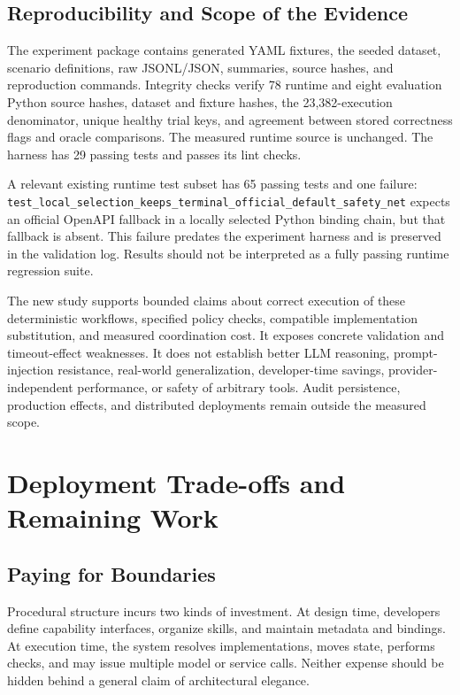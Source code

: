 \documentclass[10pt,twocolumn,a4paper]{article}
\begin{document}
\subsection{Reproducibility and Scope of the Evidence}

The experiment package contains generated YAML fixtures, the seeded dataset, scenario definitions, raw JSONL/JSON, summaries, source hashes, and reproduction commands. Integrity checks verify 78 runtime and eight evaluation Python source hashes, dataset and fixture hashes, the 23,382-execution denominator, unique healthy trial keys, and agreement between stored correctness flags and oracle comparisons. The measured runtime source is unchanged. The harness has 29 passing tests and passes its lint checks.


A relevant existing runtime test subset has 65 passing tests and one failure: {\small{}\nolinkurl{test_local_selection_keeps_terminal_official_default_safety_net}} expects an official OpenAPI fallback in a locally selected Python binding chain, but that fallback is absent. This failure predates the experiment harness and is preserved in the validation log. Results should not be interpreted as a fully passing runtime regression suite.


The new study supports bounded claims about correct execution of these deterministic workflows, specified policy checks, compatible implementation substitution, and measured coordination cost. It exposes concrete validation and timeout-effect weaknesses. It does not establish better LLM reasoning, prompt-injection resistance, real-world generalization, developer-time savings, provider-independent performance, or safety of arbitrary tools. Audit persistence, production effects, and distributed deployments remain outside the measured scope.


\FloatBarrier

\section{Deployment Trade-offs and Remaining Work}

\subsection{Paying for Boundaries}

Procedural structure incurs two kinds of investment. At design time, developers define capability interfaces, organize skills, and maintain metadata and bindings. At execution time, the system resolves implementations, moves state, performs checks, and may issue multiple model or service calls. Neither expense should be hidden behind a general claim of architectural elegance.
\end{document}
